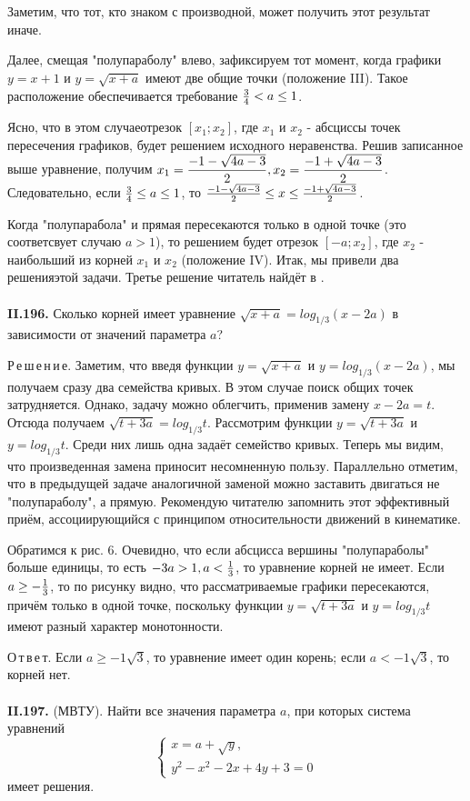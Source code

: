 \documentclass{article}
\begin{document}
 
 
Заметим, что тот, кто знаком с производной, может получить этот результат иначе.
 
Далее, смещая "полупараболу" влево, зафиксируем тот момент, когда графики $y = x + 1$ и $y = \sqrt{x + a} $ имеют две общие точки (положение III). Такое расположение обеспечивается требование ${{3}\over{4}} < a \leq 1 $.
 
Ясно, что в этом случаеотрезок $[x_1; x_2]$, где $x_1$ и $x_2$ - абсциссы точек пересечения графиков, будет решением исходного неравенства. Решив записанное выше уравнение, получим $\displaystyle x_1 = {{-1 - \sqrt{4a - 3}}\over{2}}, x_2 = {{-1 + \sqrt{4a - 3}}\over{2}} $. Следовательно, если ${{3}\over{4}} \leq a \leq 1$, то $ {{-1 - \sqrt{4a - 3}}\over{2}} \leq x \leq {{-1 + \sqrt{4a - 3}}\over{2}}$.
 
Когда "полупарабола" и прямая пересекаются только в одной точке (это соответсвует случаю $a > 1$), то решением будет отрезок $[-a; x_2]$, где $x_2$  - наибольший из корней $x_1$ и $x_2$ (положение IV).
Итак, мы привели два решенияэтой задачи. Третье решение читатель найдёт в .
\\\\
\textbf{II.196.} Сколько корней имеет уравнение $\sqrt{x+a} = log_{1/3}(x - 2a)$ в зависимости от значений параметра $a$?
  
 Р\,е\,ш\,е\,н\,и\,е. Заметим, что введя функции $y = \sqrt{x + a}$ и $y = log_{1/3}(x - 2a)$, мы получаем сразу два семейства кривых. В этом случае поиск общих точек затрудняется. Однако, задачу можно облегчить, применив замену $x -2a = t$. Отсюда получаем $\sqrt{t + 3a} = log_{1/3}t$. Рассмотрим функции $y = \sqrt{t + 3a}$ и $y = log_{1/3}t$.
Среди них лишь одна задаёт семейство кривых. Теперь мы видим, что произведенная замена приносит несомненную пользу. Параллельно отметим, что в предыдущей задаче аналогичной заменой можно заставить двигаться не "полупараболу", а прямую. Рекомендую читателю запомнить этот эффективный приём, ассоциирующийся с принципом относительности движений в кинематике.
 
Обратимся к рис. 6. Очевидно, что если абсцисса вершины "полупараболы" больше единицы, то есть
$-3a > 1, a < {{1}\over{3}}$, то уравнение корней не имеет. Если $a \geq - {{1}\over{3}}$, то по рисунку видно, что рассматриваемые графики пересекаются, причём только в одной точке, поскольку функции $y = \sqrt{t + 3a}$ и $y = log_{1/3}t$  имеют разный характер монотонности.
 
О\,т\,в\,е\,т. Если $a \geq - {{1}\sqrt{3}}$, то уравнение имеет один корень; если $a < - {{1}\sqrt{3}}$, то корней нет.
\\\\
\textbf{II.197.} (МВТУ). Найти все значения параметра $a$, при которых система уравнений
\begin{equation*}
 \begin{cases}
   x = a + \sqrt{y}, 
   \\
   y^2 - x^2 - 2x + 4y + 3 = 0
 \end{cases}
\end{equation*}
имеет решения.
 
\end{document}
